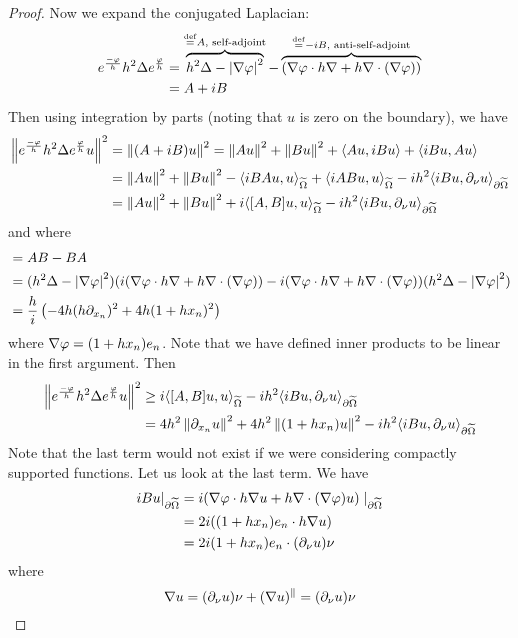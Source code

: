 \begin{proof}
  Now we expand the conjugated Laplacian:
  \begin{align*}
    e^\frac{-\varphi}{h} h^2 \Delta e^\frac{\varphi} h &= \overbrace{h^2\Delta - \left\lvert \nabla\varphi \right\rvert^2}^{\overset{\mathrm{def}}{=} A, \text{ self-adjoint}} - \overbrace{(\nabla\varphi \cdot h\nabla + h\nabla \cdot (\nabla\varphi))}^{\overset{\mathrm{def}}{=} -iB, \text{ anti-self-adjoint}} \\
    &= A+iB
  \end{align*}
  Then using integration by parts (noting that $u$ is zero on the boundary), we have
  \begin{align*}
    \left\lVert  e^\frac{-\varphi}{h} h^2 \Delta e^\frac{\varphi} h u  \right\rVert^2 &= \left\lVert  (A+iB)u \right\rVert^2 = \left\lVert Au \right\rVert^2+\left\lVert Bu \right\rVert^2 + {\left\langle Au,iBu \right\rangle} + {\left\langle iBu,Au \right\rangle} \\
    &= \left\lVert Au \right\rVert^2 + \left\lVert Bu \right\rVert^2 - {\left\langle iBAu,u \right\rangle}_{\widetilde\Omega} + {\left\langle iABu,u \right\rangle}_{\widetilde\Omega} - ih^2{\left\langle iBu,\partial_\nu u \right\rangle}_{\partial\widetilde\Omega} \\
    &= \left\lVert Au \right\rVert^2 + \left\lVert Bu \right\rVert^2 + i{\left\langle [A,B]u,u \right\rangle}_{\widetilde\Omega} -ih^2{\left\langle iBu,\partial_\nu u \right\rangle}_{\partial\widetilde\Omega}
  \end{align*}
  and where
  \begin{align*}
    [A,B] &= AB-BA \\
    &= (h^2\Delta-\abs{\nabla\ph}^2)(i(\nabla\ph \cdot h\nabla + h\nabla \cdot (\nabla\ph)) - i(\nabla\ph \cdot h\nabla + h \nabla \cdot (\nabla\ph)) (h^2\Delta - \abs{\nabla\ph}^2) \\
      &= \frac hi \left( -4h(h\p_{x_n})^2 + 4h(1+hx_n)^2 \right)
  \end{align*}
  where $\nabla\varphi = (1+hx_n)e_n$.
  Note that we have defined inner products to be linear in the first argument.
  Then
  \begin{align*}
    \left\lVert  e^\frac{-\varphi}{h} h^2 \Delta e^\frac{\varphi} h u  \right\rVert^2 &\geq i{\left\langle [A,B]u,u \right\rangle}_{\widetilde\Omega} -ih^2{\left\langle iBu,\partial_\nu u \right\rangle}_{\partial\widetilde\Omega} \\
    &= 4h^2 \left\lVert \partial_{x_n}u \right\rVert^2 + 4h^2\left\lVert (1+hx_n)u \right\rVert^2 - ih^2{\left\langle iBu,\partial_\nu u \right\rangle}_{\partial\widetilde\Omega}
  \end{align*}
  Note that the last term would not exist if we were considering compactly supported functions.
  Let us look at the last term.
  We have
  \begin{align*}
    iBu|_{\partial\widetilde\Omega} &= i( \nabla\varphi \cdot h\nabla u + h\nabla \cdot (\nabla\varphi )u) \mid_{\partial\widetilde\Omega} \\
    &= 2i( (1+hx_n)e_n \cdot h \nabla u) \\
    &= 2i(1+hx_n)e_n \cdot (\partial_\nu u) \nu
  \end{align*}
  where
  \[ \nabla u = (\partial_\nu u) \nu + (\nabla u)^\parallel = (\partial_\nu u)\nu \]

\end{proof}
